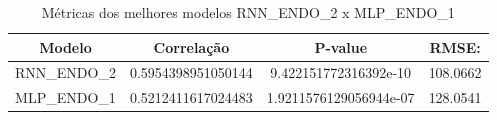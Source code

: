 \documentclass[	12pt, Times, openright, twoside, a4paper, english, brazil]{abntex2}
\begin{document}
            \begin{table}[!ht]
            \centering
            \begin{tabular}{|c|c|c|c|}
            \rowcolor{gray!50}
            \hline
                Modelo &  Correlação & P-value & RMSE: \\ \hline
                RNN\_ENDO\_2 & 0.5954398951050144 & 9.422151772316392e-10 & 108.0662\\ 
                 MLP\_ENDO\_1 & 0.5212411617024483 & 1.9211576129056944e-07 & 128.0541\\
            \hline 
            \end{tabular}
            \caption{Métricas dos melhores modelos RNN\_ENDO\_2 x MLP\_ENDO\_1}
            \label{table:case1_GRUvsMLP}
            \end{table}
            
            {\begin{center} \begin{minipage}[b]{1.0\textwidth}
            \begin{figure}[H]
            \end{figure}\end{minipage} \hfill %
                      \begin{minipage}[b]{1.0\textwidth}
            \begin{figure}[H]
            \end{figure} \end{minipage} \end{center} }
            
\end{document}
